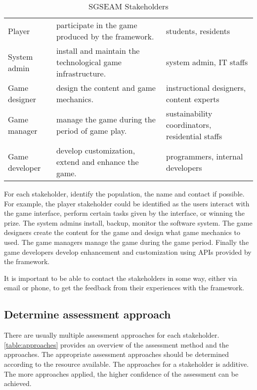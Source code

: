 \begin{table}[ht!]
  \centering
  \begin{tabular}{|p{}|P{0.42\columnwidth}|P{0.28\columnwidth}|}
    \hline
     &
     &
     \\
    \hline
    Player &
    participate in the game produced by the framework. &
    students, residents \\
    \hline
    System admin &
    install and maintain the technological game infrastructure. &
    system admin, IT staffs \\
    \hline
    Game designer &
    design the content and game mechanics. &
    instructional designers, content experts \\
    \hline
    Game manager &
    manage the game during the period of game play.&
    sustainability coordinators, residential staffs\\
    \hline
    Game developer &
    develop customization, extend and enhance the game. &
    programmers, internal developers \\
    \hline
  \end{tabular}
  \caption{SGSEAM Stakeholders}
  \label{table:stakeholders}
\end{table}

For each stakeholder, identify the population, the name and contact if possible. For example, the 
player stakeholder could be identified as the users interact with the game interface, perform certain tasks given by the interface, or winning the prize. The system admins install, backup, monitor the software system. The game designers create the content for the game and design what game mechanics to used. The game managers manage the game during the game period. Finally the game developers develop enhancement and customization using APIs provided by the framework.

It is important to be able to contact the stakeholders in some way, either via email or phone, to get the feedback from their experiences with the framework.

\subsection{Determine assessment approach}

There are usually multiple assessment approaches for each stakeholder.  \autoref{table:approaches} provides 
an overview of the assessment method and the approaches. The appropriate assessment approaches should 
be determined according to the resource available. The approaches for a stakeholder is additive. The more 
approaches applied, the higher confidence of the assessment can be achieved.

